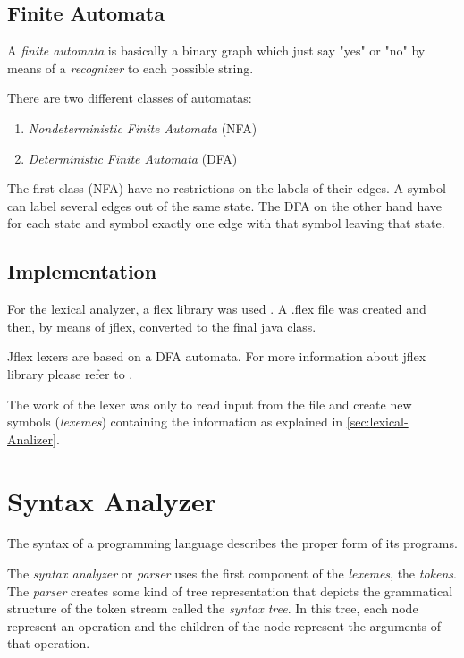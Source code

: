 \documentclass[conference]{IEEEtran}
\begin{document}
\subsection{Finite Automata}
A \textit{finite automata} is basically a binary graph which just say "yes" or "no" by means of a \textit{recognizer} to each possible string.

There are two different classes of automatas:
\begin{enumerate}
	\item \textit{Nondeterministic Finite Automata} (NFA)
	\item \textit{Deterministic Finite Automata} (DFA)
\end{enumerate}
The first class (NFA) have no restrictions on the labels of their edges. A symbol can label several edges out of the same state. The DFA on the other hand have for each state and symbol exactly one edge with that symbol leaving that state. 

\subsection{Implementation}

For the lexical analyzer, a flex library was used \cite{JFLEX}. A .flex file was created and then, by means of jflex, converted to the final java class.

Jflex lexers are based on a DFA automata. For more information about jflex library please refer to \cite{JFLEX_MANUAL}. 

The work of the lexer was only to read input from the file and create new symbols (\textit{lexemes}) containing the information as explained in \ref{sec:lexical-Analizer}.

\section{Syntax Analyzer} \label{sub_syntax_analyzer}

The syntax of a programming language describes the proper form of its programs.

The \textit{syntax analyzer} or \textit{parser} uses the first component of the \textit{lexemes}, the \textit{tokens}. The \textit{parser} creates some kind of tree representation that depicts the grammatical structure of the token stream called the \textit{syntax tree}. In this tree, each node represent an operation and the children of the node represent the arguments of that operation. 
\end{document}
